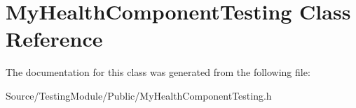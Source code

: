 \hypertarget{class_my_health_component_testing}{}\section{My\+Health\+Component\+Testing Class Reference}
\label{class_my_health_component_testing}


The documentation for this class was generated from the following file\+:\begin{DoxyCompactItemize}
\item 
Source/\+Testing\+Module/\+Public/My\+Health\+Component\+Testing.\+h\end{DoxyCompactItemize}
